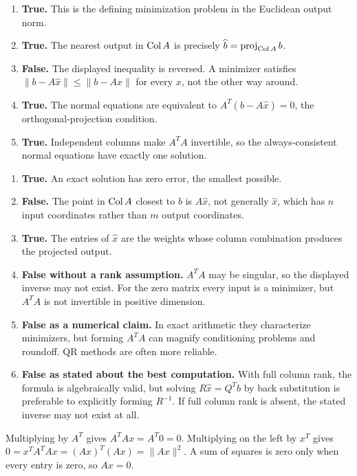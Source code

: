 \begin{enumerate}[label=(\alph*)]
\item \textbf{True.} This is the defining minimization problem in the
Euclidean output norm.
\item \textbf{True.} The nearest output in $\operatorname{Col} A$ is precisely
$\widehat b=\operatorname{proj}_{\operatorname{Col} A}b$.
\item \textbf{False.} The displayed inequality is reversed. A minimizer
satisfies $\|b-A\widehat x\|\le\|b-Ax\|$ for every $x$,
not the other way around.
\item \textbf{True.} The normal equations are equivalent to
$A^T(b-A\widehat x)=0$, the orthogonal-projection condition.
\item \textbf{True.} Independent columns make $A^TA$ invertible,
so the always-consistent normal equations have exactly one solution.
\end{enumerate}

\begin{enumerate}[label=(\alph*)]
\item \textbf{True.} An exact solution has zero error, the smallest possible.
\item \textbf{False.} The point in $\operatorname{Col} A$ closest to $b$ is
$A\widehat x$, not generally $\widehat x$, which has $n$ input
coordinates rather than $m$ output coordinates.
\item \textbf{True.} The entries of $\widehat x$ are the weights
whose column combination produces the projected output.
\item \textbf{False without a rank assumption.} $A^TA$ may be singular,
so the displayed inverse may not exist. For the zero matrix every
input is a minimizer, but $A^TA$ is not invertible in positive dimension.
\item \textbf{False as a numerical claim.} In exact arithmetic they
characterize minimizers, but forming $A^TA$ can magnify conditioning
problems and roundoff. QR methods are often more reliable.
\item \textbf{False as stated about the best computation.} With full
column rank, the formula is algebraically valid, but solving
$R\widehat x=Q^Tb$ by back substitution is preferable to explicitly
forming $R^{-1}$. If full column rank is absent, the stated inverse
may not exist at all.
\end{enumerate}

Multiplying by $A^T$ gives $A^TAx=A^T0=0$.
Multiplying on the left by $x^T$ gives
$0=x^TA^TAx=(Ax)^T(Ax)=\|Ax\|^2$.
A sum of squares is zero only when every entry is zero, so $Ax=0$.

